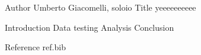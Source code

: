 Author Umberto Giacomelli, soloio
Title yeeeeeeeeee

Introduction
Data testing
Analysis
Conclusion

Reference
ref.bib
